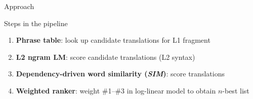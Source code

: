 \documentclass[final,t]{beamer}
\begin{document}
\begin{frame}{}
\begin{columns}[t]
\begin{column}{.5\linewidth}
\begin{block}{Approach}
\end{block}

\begin{block}{Steps in the pipeline}
  \begin{enumerate}
  \item \textbf{Phrase table}: 
    look up candidate translations for L1 fragment
  \item \textbf{L2 ngram LM}: score candidate translations (L2 syntax)
  \item \textbf{Dependency-driven word similarity (\textit{SIM})}:
    score translations %
  \item \textbf{Weighted ranker}: weight \#1--\#3 in log-linear model
    to obtain $n$-best list
  \end{enumerate}
\end{block}


\end{column}
\end{columns}
\end{frame}
\end{document}
